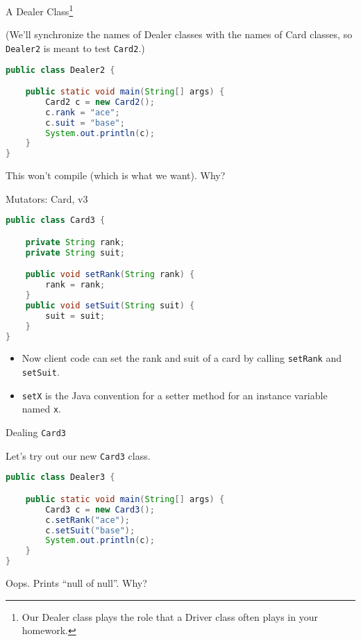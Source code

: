 \documentclass{beamer}
\begin{document}
\begin{frame}[fragile]{A Dealer Class\footnote{Our Dealer class plays the role that a Driver class often plays in your homework.}}


(We'll synchronize the names of Dealer classes with the names of Card classes, so {\tt Dealer2} is meant to test {\tt Card2}.) 
\begin{lstlisting}[language=Java]
public class Dealer2 {

    public static void main(String[] args) {
        Card2 c = new Card2();
        c.rank = "ace";
        c.suit = "base";
        System.out.println(c);
    }
}
\end{lstlisting}

This won't compile (which is what we want). Why?

\end{frame}

\begin{frame}[fragile]{Mutators: Card, v3}

\begin{lstlisting}[language=Java]
public class Card3 {

    private String rank;
    private String suit;

    public void setRank(String rank) {
        rank = rank;
    }
    public void setSuit(String suit) {
        suit = suit;
    }
}
\end{lstlisting}
\begin{itemize}
\item Now client code can set the rank and suit of a card by calling {\tt setRank} and {\tt setSuit}.
\item {\tt setX} is the Java convention for a setter method for an instance variable named {\tt x}.
\end{itemize}

\end{frame}

\begin{frame}[fragile]{Dealing {\tt Card3}}


Let's try out our new {\tt Card3} class.
\begin{lstlisting}[language=Java]
public class Dealer3 {

    public static void main(String[] args) {
        Card3 c = new Card3();
        c.setRank("ace");
        c.setSuit("base");
        System.out.println(c);
    }
}
\end{lstlisting}

Oops.  Prints ``null of null''.  Why?


\end{frame}
\end{document}
